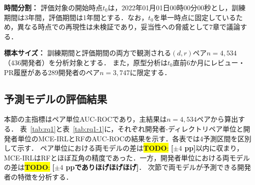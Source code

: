 \documentclass[submit,noauthor,ses,dvipdfmx]{ipsj}
\newcommand{\todo}[1]{\colorbox{yellow}{{\bf TODO}:}{\color{red} {\textbf{[#1]}}}}
\begin{document}
\noindent\textbf{時間分割：}
評価対象の開始時点$t_0$は，2022年01月01日00時00分00秒とし，訓練期間は3年間，評価期間は1年間とする．なお，$t_0$を単一時点に固定しているため，異なる時点での再現性は未検証であり，妥当性への脅威として7章で議論する．

\noindent\textbf{標本サイズ：}
訓練期間と評価期間の両方で観測される$(d, r)$ペア$n = 4,534$（436開発者）を分析対象とする．
また，原型分析は$t_0$直前6か月にレビュー・PR履歴がある289開発者のペア$n = 3,747$に限定する．



\subsection{予測モデルの評価結果}

本節の主指標はペア単位AUC-ROCであり，主結果は$n = 4{,}534$ペアから算出する．
表~\ref{tab:rq1}と表~\ref{tab:rq1-1}に，それぞれ開発者-ディレクトリペア単位と開発者単位のMCE-IRLとRFのAUC-ROCの結果を示す．各表では4予測区間を区別して示す．
ペア単位における両モデルの差は\todo{$\pm4$ pp}以内に収まり，MCE-IRLはRFとほぼ互角の精度であった．一方，開発者単位における両モデルの差は\todo{$\pm4$ ppでありほげほげほげ}．
次節で両モデルが予測できる開発者の特徴を分析する．

\end{document}
